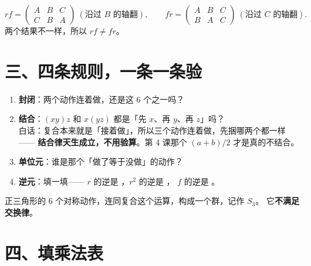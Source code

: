 \begin{example}
  \[
    rf=\begin{pmatrix}A&B&C\\C&B&A\end{pmatrix}\ (\text{沿过 }B\text{ 的轴翻}), \qquad
    fr=\begin{pmatrix}A&B&C\\B&A&C\end{pmatrix}\ (\text{沿过 }C\text{ 的轴翻}).
  \]
  两个结果不一样，所以 \(rf\neq fr\)。
\end{example}

\section*{三、四条规则，一条一条验}

\begin{dongshou}

  \begin{enumerate}
    \item \textbf{封闭}：两个动作连着做，还是这 \(6\) 个之一吗？\underline{\hspace{3em}}
    \item \textbf{结合}：\((xy)z\) 和 \(x(yz)\) 都是「先 \(x\)、再 \(y\)、再 \(z\)」吗？\underline{\hspace{3em}}\\
      白话：复合本来就是「接着做」，所以三个动作连着做，先捆哪两个都一样——
      \textbf{结合律天生成立，不用验算}。第 4 课那个 \((a+b)/2\) 才是真的不结合。
    \item \textbf{单位元}：谁是那个「做了等于没做」的动作？\underline{\hspace{3em}}
    \item \textbf{逆元}：填一填——
      \(r\) 的逆是 \underline{\hspace{1.6em}}，\(r^2\) 的逆是 \underline{\hspace{1.6em}}，
      \(f\) 的逆是 \underline{\hspace{1.6em}}。
  \end{enumerate}
\end{dongshou}

\begin{dingli}[三角形动作群]
  正三角形的 \(6\) 个对称动作，连同复合这个运算，构成一个群，记作 \(S_3\)。
  它\textbf{不满足交换律}。
\end{dingli}

\section*{四、填乘法表}

